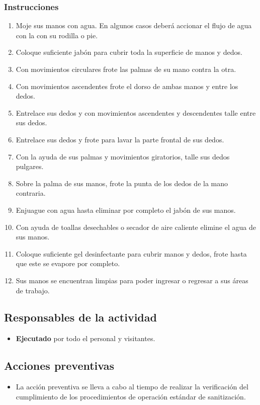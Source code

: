 \subsubsection{Instrucciones}

\begin{enumerate}
	\item Moje sus manos con agua. En algunos casos deberá accionar el flujo de agua con la con su rodilla o pie.
	\item Coloque suficiente jabón para cubrir toda la superficie de manos y dedos.
	\item Con movimientos circulares frote las palmas de su mano contra la otra.
	\item Con movimientos ascendentes frote el dorso de ambas manos y entre los dedos.
	\item Entrelace sus dedos y con movimientos ascendentes y descendentes talle entre sus dedos.
	\item Entrelace sus dedos y frote para lavar la parte frontal de sus dedos.
	\item Con la ayuda de sus palmas y movimientos giratorios, talle sus dedos pulgares.
	\item Sobre la palma de sus manos, frote la punta de los dedos de la mano contraria.
	\item Enjuague con agua hasta eliminar por completo el jabón de sus manos.
	\item Con ayuda de toallas desechables o secador de aire caliente elimine el agua de sus manos.
	\item Coloque suficiente gel desinfectante para cubrir manos y dedos, frote hasta que este se evapore por completo.
	\item Sus manos se encuentran limpias para poder ingresar o regresar a sus áreas de trabajo.
\end{enumerate}

\subsection{Responsables de la actividad}

\begin{itemize}
	\item \textbf{Ejecutado} por todo el personal y visitantes.
\end{itemize}

\subsection{Acciones preventivas}
\begin{itemize}
	\item La acción preventiva se lleva a cabo al tiempo de realizar la verificación del cumplimiento de los procedimientos de operación estándar de sanitización.
\end{itemize}

